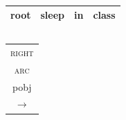 \documentclass[t]{beamer}
\begin{document}
\begin{frame}
{\begin{varwidth}{2.3\linewidth}
{	\\
	\begin{tabular}{|l|l|l|l|}\hline
	\color{red} root & \color{red} sleep & \color{red} in & \color{red} class \\ \hline
	\end{tabular}
	\hspace{14mm}
	\begin{tabular}{|l|}\hline
	\quad \\ \hline
	\end{tabular}
	}
	\begin{tabular}{c}\textsc{right}\\ \textsc{arc}\\{\footnotesize pobj}\\$\rightarrow$\end{tabular}
	
    \vspace{5mm}
	

\end{varwidth}}
\end{frame}
\end{document}
